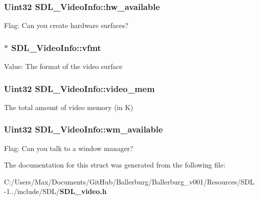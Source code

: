 \subsubsection[{hw\+\_\+available}]{\setlength{\rightskip}{0pt plus 5cm}Uint32 S\+D\+L\+\_\+\+Video\+Info\+::hw\+\_\+available}\label{struct_s_d_l___video_info_a515e38f0a122a45fe67230e3929670f5}
Flag\+: Can you create hardware surfaces? 
\subsubsection[{vfmt}]{$\ast$ S\+D\+L\+\_\+\+Video\+Info\+::vfmt}\label{struct_s_d_l___video_info_a8501500d288bda9c60d8251138478f08}
Value\+: The format of the video surface 
\subsubsection[{video\+\_\+mem}]{\setlength{\rightskip}{0pt plus 5cm}Uint32 S\+D\+L\+\_\+\+Video\+Info\+::video\+\_\+mem}\label{struct_s_d_l___video_info_ab706d6c856b170f8da28786e98fb5de3}
The total amount of video memory (in K) 
\subsubsection[{wm\+\_\+available}]{\setlength{\rightskip}{0pt plus 5cm}Uint32 S\+D\+L\+\_\+\+Video\+Info\+::wm\+\_\+available}\label{struct_s_d_l___video_info_aa7dee6b91b73acd0476d67d7036669e9}
Flag\+: Can you talk to a window manager? 

The documentation for this struct was generated from the following file\+:\begin{DoxyCompactItemize}
\item 
C\+:/\+Users/\+Max/\+Documents/\+Git\+Hub/\+Ballerburg/\+Ballerburg\+\_\+v001/\+Resources/\+S\+D\+L-\/1../include/\+S\+D\+L/{\bf S\+D\+L\+\_\+video.\+h}\end{DoxyCompactItemize}

